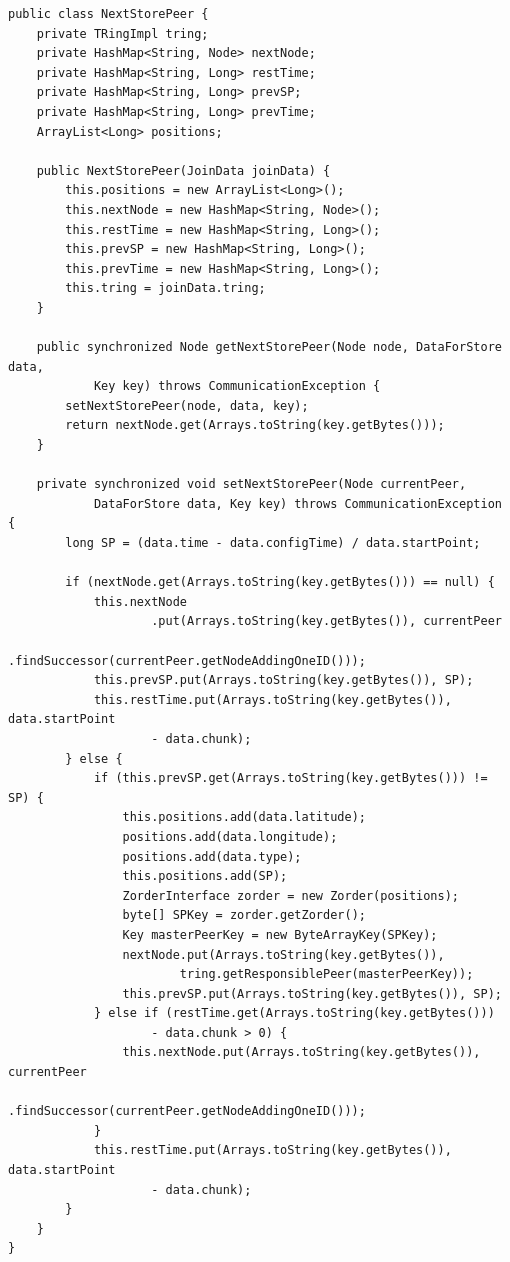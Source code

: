 \begin{lstlisting}[caption=データ保存時の保存ピア発見]
public class NextStorePeer {
	private TRingImpl tring;
	private HashMap<String, Node> nextNode;
	private HashMap<String, Long> restTime;
	private HashMap<String, Long> prevSP;
	private HashMap<String, Long> prevTime;
	ArrayList<Long> positions;

	public NextStorePeer(JoinData joinData) {
		this.positions = new ArrayList<Long>();
		this.nextNode = new HashMap<String, Node>();
		this.restTime = new HashMap<String, Long>();
		this.prevSP = new HashMap<String, Long>();
		this.prevTime = new HashMap<String, Long>();
		this.tring = joinData.tring;
	}

	public synchronized Node getNextStorePeer(Node node, DataForStore data,
			Key key) throws CommunicationException {
		setNextStorePeer(node, data, key);
		return nextNode.get(Arrays.toString(key.getBytes()));
	}

	private synchronized void setNextStorePeer(Node currentPeer,
			DataForStore data, Key key) throws CommunicationException {
		long SP = (data.time - data.configTime) / data.startPoint;

		if (nextNode.get(Arrays.toString(key.getBytes())) == null) {
			this.nextNode
					.put(Arrays.toString(key.getBytes()), currentPeer
							.findSuccessor(currentPeer.getNodeAddingOneID()));
			this.prevSP.put(Arrays.toString(key.getBytes()), SP);
			this.restTime.put(Arrays.toString(key.getBytes()), data.startPoint
					- data.chunk);
		} else {
			if (this.prevSP.get(Arrays.toString(key.getBytes())) != SP) {
				this.positions.add(data.latitude);
				positions.add(data.longitude);
				positions.add(data.type);
				this.positions.add(SP);
				ZorderInterface zorder = new Zorder(positions);
				byte[] SPKey = zorder.getZorder();
				Key masterPeerKey = new ByteArrayKey(SPKey);
				nextNode.put(Arrays.toString(key.getBytes()),
						tring.getResponsiblePeer(masterPeerKey));
				this.prevSP.put(Arrays.toString(key.getBytes()), SP);
			} else if (restTime.get(Arrays.toString(key.getBytes()))
					- data.chunk > 0) {
				this.nextNode.put(Arrays.toString(key.getBytes()), currentPeer
						.findSuccessor(currentPeer.getNodeAddingOneID()));
			}
			this.restTime.put(Arrays.toString(key.getBytes()), data.startPoint
					- data.chunk);
		}
	}
}
\end{lstlisting}

